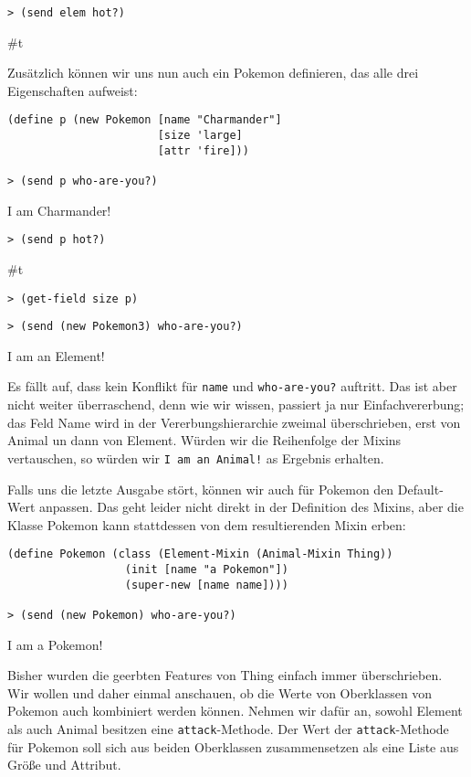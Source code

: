 \begin{lstlisting}
> (send elem hot?)
\end{lstlisting} 
{\routput \#t}

Zusätzlich können wir uns nun auch ein Pokemon definieren, das alle drei Eigenschaften aufweist:
\begin{lstlisting}
(define p (new Pokemon [name "Charmander"]
                       [size 'large]
                       [attr 'fire]))
 
> (send p who-are-you?)
\end{lstlisting}
{\routput {\qq}I am Charmander!\qq}
\begin{lstlisting}
> (send p hot?)
\end{lstlisting}
{\routput \#t}
\begin{lstlisting}
> (get-field size p)
\end{lstlisting}
{}
\begin{lstlisting}
> (send (new Pokemon3) who-are-you?)
\end{lstlisting}
{\routput {\qq}I am an Element!\qq}

Es fällt auf, dass kein Konflikt für \texttt{name} und \texttt{who-are-you?} auftritt. Das ist aber nicht weiter überraschend, denn wie wir wissen, passiert ja nur Einfachvererbung; das Feld Name wird in der Vererbungshierarchie zweimal überschrieben, erst von Animal un dann von Element. Würden wir die Reihenfolge der Mixins vertauschen, so würden wir \texttt{{\qq}I am an Animal!\qq} as Ergebnis erhalten.

Falls uns die letzte Ausgabe stört, können wir auch für Pokemon den Default-Wert anpassen. Das geht leider nicht direkt in der Definition des Mixins, aber die Klasse Pokemon kann stattdessen von dem resultierenden Mixin erben:

\begin{lstlisting}
(define Pokemon (class (Element-Mixin (Animal-Mixin Thing))
                  (init [name "a Pokemon"])
                  (super-new [name name])))
     
> (send (new Pokemon) who-are-you?)
\end{lstlisting}
{\routput {\qq}I am a Pokemon!\qq}

Bisher wurden die geerbten Features von Thing einfach immer überschrieben. Wir wollen und daher einmal anschauen, ob die Werte von Oberklassen von Pokemon auch kombiniert werden können. Nehmen wir dafür an, sowohl Element als auch Animal besitzen eine \texttt{attack}-Methode. Der Wert der \texttt{attack}-Methode für Pokemon soll sich aus beiden Oberklassen zusammensetzen als eine Liste aus Größe und Attribut.

